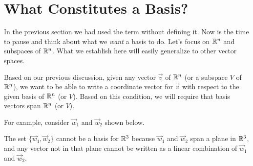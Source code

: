 \documentclass{ximera}
\begin{document}
\section*{What Constitutes a Basis?}

In the previous section we had used the term  without defining it.  Now is the time to pause and think about what we {\it want} a basis to do.  Let's focus on $\mathbb{R}^n$ and subspaces of $\mathbb{R}^n$.  What we establish here will easily generalize to other vector spaces.  


Based on our previous discussion, given any vector $\vec{v}$ of $\mathbb{R}^n$ (or a subspace $V$ of $\mathbb{R}^n$), we want to be able to write a coordinate vector for $\vec{v}$ with respect to the given basis of $\mathbb{R}^n$ (or $V$).  Based on this condition, we will require that basis vectors span $\mathbb{R}^n$ (or $V$).

For example, consider $\vec{w}_1$ and $\vec{w}_2$ shown below.  

\begin{image}
\end{image}
The set $\{\vec{w}_1, \vec{w}_2\}$ cannot be a basis for $\mathbb{R}^3$ because $\vec{w}_1$ and $\vec{w}_2$ span a plane in $\mathbb{R}^3$, and any vector not in that plane cannot be written as a linear combination of $\vec{w}_1$ and $\vec{w}_2$.
\end{document}
